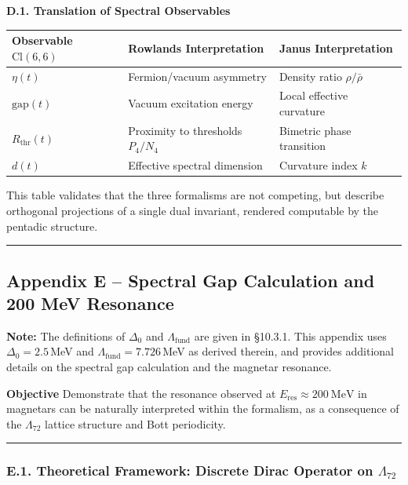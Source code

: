 \documentclass[11pt]{article}
\begin{document}
\textbf{D.1. Translation of Spectral Observables}

\begin{table}[H]
\centering
\begin{tabular}{@{}lll@{}}
\toprule
Observable $\text{Cl}(6,6)$ & Rowlands Interpretation & Janus Interpretation \\
\midrule
$\eta(t)$ & Fermion/vacuum asymmetry & Density ratio $\rho/\bar{\rho}$ \\
$\text{gap}(t)$ & Vacuum excitation energy & Local effective curvature \\
$R_{\text{thr}}(t)$ & Proximity to thresholds $P_4/N_4$ & Bimetric phase transition \\
$d(t)$ & Effective spectral dimension & Curvature index $k$ \\
\bottomrule
\end{tabular}
\end{table}

This table validates that the three formalisms are not competing, but
describe orthogonal projections of a single dual invariant, rendered
computable by the pentadic structure.

\begin{center}\rule{0.5\linewidth}{0.5pt}\end{center}

\hypertarget{appendix-e-spectral-gap-calculation-and-200-mev-resonance}{%
\subsection{Appendix E -- Spectral Gap Calculation and 200 MeV
Resonance}\label{appendix-e-spectral-gap-calculation-and-200-mev-resonance}}

\textbf{Note:} The definitions of \(\Delta_0\) and
\(\Lambda_{\text{fund}}\) are given in §10.3.1. This appendix uses
\(\Delta_0 = 2.5\)\,MeV and \(\Lambda_{\text{fund}} = 7.726\)\,MeV as
derived therein, and provides additional details on the spectral gap
calculation and the magnetar resonance.

\textbf{Objective} Demonstrate that the resonance observed at
\(E_{\text{res}} \approx 200\ \text{MeV}\) in magnetars can be naturally
interpreted within the formalism, as a consequence of the
\(\Lambda_{72}\) lattice structure and Bott periodicity.

\begin{center}\rule{0.5\linewidth}{0.5pt}\end{center}

\hypertarget{e.1.-theoretical-framework-discrete-dirac-operator-on-lambda_72}{%
\subsubsection{\texorpdfstring{E.1. Theoretical Framework: Discrete
Dirac Operator on
\(\Lambda_{72}\)}{E.1. Theoretical Framework: Discrete Dirac Operator on \textbackslash Lambda\_\{72\}}}\label{e.1.-theoretical-framework-discrete-dirac-operator-on-lambda_72}}
\end{document}

